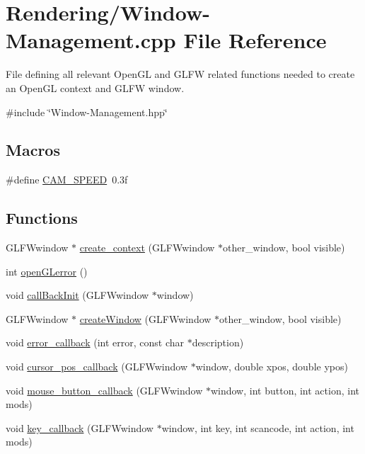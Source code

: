 \hypertarget{Window-Management_8cpp}{}\section{Rendering/\+Window-\/\+Management.cpp File Reference}
\label{Window-Management_8cpp}


File defining all relevant Open\+GL and G\+L\+FW related functions needed to create an Open\+GL context and G\+L\+FW window.  


{\ttfamily \#include \char`\"{}Window-\/\+Management.\+hpp\char`\"{}}\newline
\subsection*{Macros}
\begin{DoxyCompactItemize}
\item 
\#define \mbox{\hyperlink{Window-Management_8cpp_ab91512fde255a648fe16920b3d94911b}{C\+A\+M\+\_\+\+S\+P\+E\+ED}}~0.\+3f
\end{DoxyCompactItemize}
\subsection*{Functions}
\begin{DoxyCompactItemize}
\item 
G\+L\+F\+Wwindow $\ast$ \mbox{\hyperlink{Window-Management_8cpp_a9397388c884393663c7db62632ce7e3b}{create\+\_\+context}} (G\+L\+F\+Wwindow $\ast$other\+\_\+window, bool visible)
\item 
int \mbox{\hyperlink{Window-Management_8cpp_a2008ec7e2e49a51a3d3f0091cf96bc55}{open\+G\+Lerror}} ()
\item 
void \mbox{\hyperlink{Window-Management_8cpp_a49a5ff4f2fc2d79e62443424b32433ec}{call\+Back\+Init}} (G\+L\+F\+Wwindow $\ast$window)
\item 
G\+L\+F\+Wwindow $\ast$ \mbox{\hyperlink{Window-Management_8cpp_a9339e5430780aba11944a8d27061c58c}{create\+Window}} (G\+L\+F\+Wwindow $\ast$other\+\_\+window, bool visible)
\item 
void \mbox{\hyperlink{Window-Management_8cpp_a4ee391c8bab624943c822faafb2c320e}{error\+\_\+callback}} (int error, const char $\ast$description)
\item 
void \mbox{\hyperlink{Window-Management_8cpp_ab9a970cff09c5a4031b814242706b4f6}{cursor\+\_\+pos\+\_\+callback}} (G\+L\+F\+Wwindow $\ast$window, double xpos, double ypos)
\item 
void \mbox{\hyperlink{Window-Management_8cpp_a5515d805e76ce6728de3c0dc5e187c86}{mouse\+\_\+button\+\_\+callback}} (G\+L\+F\+Wwindow $\ast$window, int button, int action, int mods)
\item 
void \mbox{\hyperlink{Window-Management_8cpp_a286930f4e8ede059b83ff6eafa2ff718}{key\+\_\+callback}} (G\+L\+F\+Wwindow $\ast$window, int key, int scancode, int action, int mods)
\end{DoxyCompactItemize}


